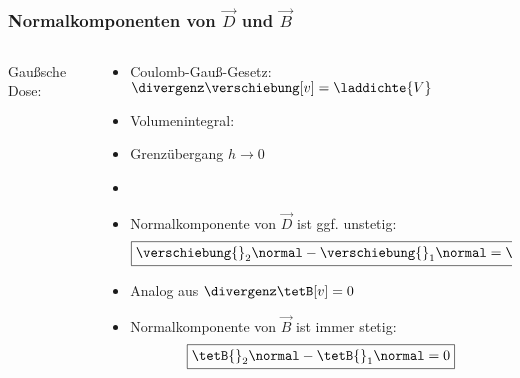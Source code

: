 \begin{frame}
  \frametitle{Normalkomponenten von $\vec{D}$ und $\vec{B}$}
\begin{columns}
  \begin{column}{0.4\textwidth}
    Gaußsche Dose:\\[2em]

    
	\resizebox{\columnwidth}{!}{}

    \end{column}
    \begin{column}{0.6\textwidth}
      \begin{itemize}
        \item<1-> Coulomb-Gauß-Gesetz: $\divergenz \verschiebung[v] =
          \laddichte{V}$
          \item<2-> Volumenintegral: 
          \item<4-> Grenzübergang $h\to0$
            \item<5-> 
          \item<7-> \alert{Normalkomponente von $\vec{D}$ ist ggf. unstetig:} 
            $$	\boxed{\verschiebung{}_2\normal -
              \verschiebung{}_1\normal = \laddichte{F}} $$
          \item<8-> Analog aus $\divergenz \tetB[v] = 0$
            \item<9-> \alert{Normalkomponente von $\vec{B}$ ist immer stetig:} 
            $$		\boxed{\tetB{}_2\normal - \tetB{}_1\normal = 0} $$
        \end{itemize}
    \end{column}
\end{columns}
 \end{frame}

